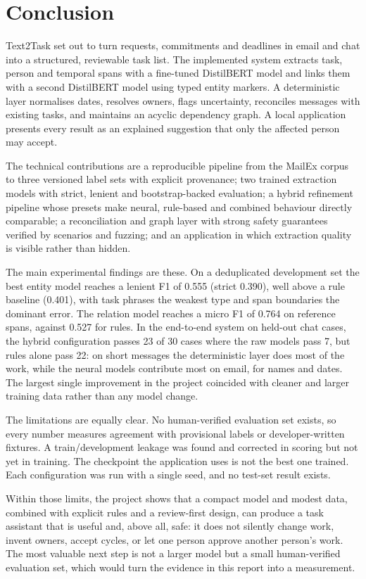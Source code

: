 \chapter{Conclusion}
\label{ch:conclusion}

Text2Task set out to turn requests, commitments and deadlines in email and chat into a structured, reviewable task list. The implemented system extracts task, person and temporal spans with a fine-tuned DistilBERT model and links them with a second DistilBERT model using typed entity markers. A deterministic layer normalises dates, resolves owners, flags uncertainty, reconciles messages with existing tasks, and maintains an acyclic dependency graph. A local application presents every result as an explained suggestion that only the affected person may accept.

The technical contributions are a reproducible pipeline from the MailEx corpus to three versioned label sets with explicit provenance; two trained extraction models with strict, lenient and bootstrap-backed evaluation; a hybrid refinement pipeline whose presets make neural, rule-based and combined behaviour directly comparable; a reconciliation and graph layer with strong safety guarantees verified by scenarios and fuzzing; and an application in which extraction quality is visible rather than hidden.

The main experimental findings are these. On a deduplicated development set the best entity model reaches a lenient F1 of 0.555 (strict 0.390), well above a rule baseline (0.401), with task phrases the weakest type and span boundaries the dominant error. The relation model reaches a micro F1 of 0.764 on reference spans, against 0.527 for rules. In the end-to-end system on held-out chat cases, the hybrid configuration passes 23 of 30 cases where the raw models pass 7, but rules alone pass 22: on short messages the deterministic layer does most of the work, while the neural models contribute most on email, for names and dates. The largest single improvement in the project coincided with cleaner and larger training data rather than any model change.

The limitations are equally clear. No human-verified evaluation set exists, so every number measures agreement with provisional labels or developer-written fixtures. A train/development leakage was found and corrected in scoring but not yet in training. The checkpoint the application uses is not the best one trained. Each configuration was run with a single seed, and no test-set result exists.

Within those limits, the project shows that a compact model and modest data, combined with explicit rules and a review-first design, can produce a task assistant that is useful and, above all, safe: it does not silently change work, invent owners, accept cycles, or let one person approve another person's work. The most valuable next step is not a larger model but a small human-verified evaluation set, which would turn the evidence in this report into a measurement.
